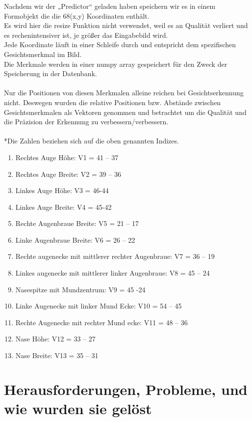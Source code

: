Nachdem wir der „Predictor“ geladen haben speichern wir es in einem Formobjekt die die 68(x,y) Koordinaten enthält. \\
Es wird hier die resize Funktion nicht verwendet, weil es an Qualität verliert und es rechenintensiver ist, je größer das Eingabebild wird. \\
Jede Koordinate läuft in einer Schleife durch und entspricht dem spezifischen Gesichtsmerkmal im Bild.  \\
Die Merkmale werden in einer numpy array gespeichert für den Zweck der Speicherung in der Datenbank. \\\\
Nur die Positionen von diesen Merkmalen alleine reichen bei Gesichtserkennung nicht. Deswegen wurden die relative Positionen bzw. Abstände zwischen Gesichtsmerkmalen als Vektoren genommen und betrachtet um die Qualität und die Präzision der Erkennung zu verbessern/verbessern. \\\\
*Die Zahlen beziehen sich auf die oben genannten Indizes. \\
\begin{enumerate}
	\item Rechtes Auge Höhe: V1 = 41 – 37 
	\item Rechtes Auge Breite: V2 = 39 – 36
	\item Linkes Auge Höhe: V3 = 46-44
	\item Linkes Auge Breite: V4 = 45-42
	\item Rechte Augenbraue Breite: V5 = 21 – 17
	\item Linke Augenbraue Breite: V6 = 26 – 22 
	\item Rechte augenecke mit mittlerer rechter Augenbraue: V7 = 36 – 19 
	\item Linkes augenecke mit mittlerer linker Augenbraue: V8 = 45 – 24 
	\item Nasespitze mit Mundzentrum: V9 = 45 -24 
	\item Linke Augenecke mit linker Mund Ecke: V10 = 54 – 45
	\item Rechte Augenecke mit rechter Mund ecke: V11 = 48 – 36 
	\item Nase Höhe: V12 = 33 – 27 
	\item Nase Breite: V13 = 35 – 31 
\end{enumerate}







\section{Herausforderungen, Probleme, und wie wurden sie gelöst}

